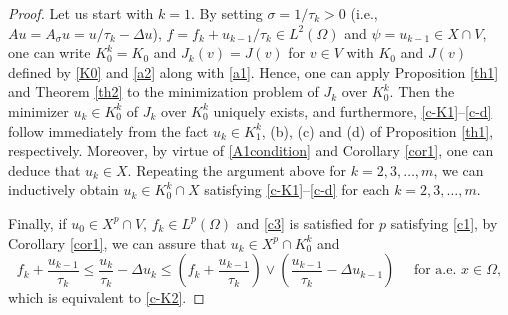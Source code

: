\documentclass[reqno,10pt]{amsart}
\begin{document}
\begin{proof}
 Let us start with $k = 1$.
 By setting $\sigma =1/\tau_k > 0$ (i.e., $Au = A_\sigma u = u/\tau_k -
 \Delta u$), $f=f_k+u_{k-1}/\tau_k \in
 L^2(\Omega)$ and $\psi =u_{k-1} \in X \cap V$, one can write
 $K_0^k=K_0$ and $J_k(v)=J(v)$ for $v \in V$ with $K_0$ and $J(v)$
 defined by \eqref{K0} and \eqref{a2} along with \eqref{a1}. Hence,
 one can apply Proposition \ref{th1} and Theorem \ref{th2} to the
 minimization problem of $J_k$ over $K_0^k$. Then the minimizer
 $u_k \in K_0^k$ of $J_k$ over $K_0^k$ uniquely exists, and
 furthermore, \eqref{c-K1}--\eqref{c-d} follow immediately from the fact
 $u_k \in
 K_1^k$, (b), (c) and (d) of Proposition \ref{th1}, respectively. Moreover,
 by virtue of \eqref{A1condition} and Corollary \ref{cor1}, one can
 deduce that $u_k \in X$.
Repeating the argument above for $k = 2,3,\ldots,m$, we can inductively
 obtain $u_k
 \in K_0^k \cap X$ satisfying \eqref{c-K1}--\eqref{c-d} for each $k =
 2,3,\ldots,m$.

 Finally, if $u_0 \in X^p \cap V$, $f_k \in L^p(\Omega)$ and \eqref{c3}
 is satisfied for $p$ satisfying \eqref{c1}, by Corollary \ref{cor1}, we
 can assure that $u_k \in X^p \cap K_0^k$ and
$$
f_k+\dfrac{u_{k-1}}{\tau_k} \leq \dfrac{u_k}{\tau_k} - \Delta u_k 
\leq \left(f_k + \dfrac{u_{k-1}}{\tau_k} \right) \vee 
\left( \dfrac{u_{k-1}}{\tau_k} - \Delta u_{k-1}\right)
\quad \mbox{ for a.e. } x \in \Omega,
$$
which is equivalent to \eqref{c-K2}.
\end{proof}
\end{document}
